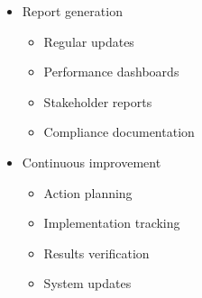 \begin{itemize}
\begin{itemize}
        \item Report generation
        \begin{itemize}
            \item Regular updates
            \item Performance dashboards
            \item Stakeholder reports
            \item Compliance documentation
        \end{itemize}
        
        \item Continuous improvement
        \begin{itemize}
            \item Action planning
            \item Implementation tracking
            \item Results verification
            \item System updates
        \end{itemize}
    \end{itemize}
\end{itemize} 